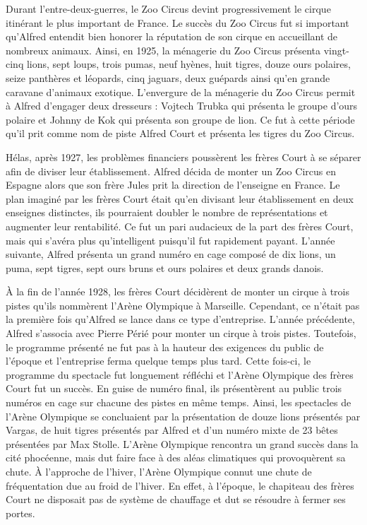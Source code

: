 Durant l’entre-deux-guerres, le Zoo Circus devint progressivement le cirque itinérant le plus important de France. Le succès du Zoo Circus fut si important qu’Alfred entendit bien honorer la réputation de son cirque en accueillant de nombreux animaux. Ainsi, en 1925, la ménagerie du Zoo Circus présenta vingt-cinq lions, sept loups, trois pumas, neuf hyènes, huit tigres, douze ours polaires, seize panthères et léopards, cinq jaguars, deux guépards ainsi qu’en grande caravane d’animaux exotique. L’envergure de la ménagerie du Zoo Circus permit à Alfred d’engager deux dresseurs : Vojtech Trubka qui présenta le groupe d’ours polaire et Johnny de Kok qui présenta son groupe de lion. Ce fut à cette période qu’il prit comme nom de piste Alfred Court et présenta les tigres du Zoo Circus.

Hélas, après 1927, les problèmes financiers poussèrent les frères Court à se séparer afin de diviser leur établissement. Alfred décida de monter un Zoo Circus en Espagne alors que son frère Jules prit la direction de l’enseigne en France. Le plan imaginé par les frères Court était qu’en divisant leur établissement en deux enseignes distinctes, ils pourraient doubler le nombre de représentations et augmenter leur rentabilité. Ce fut un pari audacieux de la part des frères Court, mais qui s’avéra plus qu’intelligent puisqu’il fut rapidement payant. L’année suivante, Alfred présenta un grand numéro en cage composé de dix lions, un puma, sept tigres, sept ours bruns et ours polaires et deux grands danois.

À la fin de l’année 1928, les frères Court décidèrent de monter un cirque à trois pistes qu’ils nommèrent l’Arène Olympique à Marseille. Cependant, ce n’était pas la première fois qu’Alfred se lance dans ce type d’entreprise. L’année précédente, Alfred s’associa avec Pierre Périé pour monter un cirque à trois pistes. Toutefois, le programme présenté ne fut pas à la hauteur des exigences du public de l’époque et l’entreprise ferma quelque temps plus tard. Cette fois-ci, le programme du spectacle fut longuement réfléchi et l’Arène Olympique des frères Court fut un succès. En guise de numéro final, ils présentèrent au public trois numéros en cage sur chacune des pistes en même temps. Ainsi, les spectacles de l’Arène Olympique se concluaient par la présentation de douze lions présentés par Vargas, de huit tigres présentés par Alfred et d’un numéro mixte de 23 bêtes présentées par Max Stolle. L’Arène Olympique rencontra un grand succès dans la cité phocéenne, mais dut faire face à des aléas climatiques qui provoquèrent sa chute. À l’approche de l’hiver, l’Arène Olympique connut une chute de fréquentation due au froid de l’hiver. En effet, à l’époque, le chapiteau des frères Court ne disposait pas de système de chauffage et dut se résoudre à fermer ses portes.


